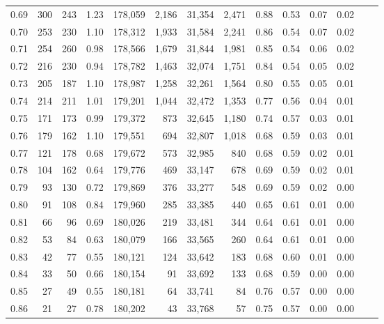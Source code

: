 \begin{tabular}{rrrrrrrrrrrrrr}
0.69 &    300 &  243 &    1.23 &  178,059 &    2,186 &  31,354 &   2,471 &  0.88 &  0.53 &  0.07 &      0.02 \\
0.70 &    253 &  230 &    1.10 &  178,312 &    1,933 &  31,584 &   2,241 &  0.86 &  0.54 &  0.07 &      0.02 \\
0.71 &    254 &  260 &    0.98 &  178,566 &    1,679 &  31,844 &   1,981 &  0.85 &  0.54 &  0.06 &      0.02 \\
0.72 &    216 &  230 &    0.94 &  178,782 &    1,463 &  32,074 &   1,751 &  0.84 &  0.54 &  0.05 &      0.02 \\
0.73 &    205 &  187 &    1.10 &  178,987 &    1,258 &  32,261 &   1,564 &  0.80 &  0.55 &  0.05 &      0.01 \\
0.74 &    214 &  211 &    1.01 &  179,201 &    1,044 &  32,472 &   1,353 &  0.77 &  0.56 &  0.04 &      0.01 \\
0.75 &    171 &  173 &    0.99 &  179,372 &      873 &  32,645 &   1,180 &  0.74 &  0.57 &  0.03 &      0.01 \\
0.76 &    179 &  162 &    1.10 &  179,551 &      694 &  32,807 &   1,018 &  0.68 &  0.59 &  0.03 &      0.01 \\
0.77 &    121 &  178 &    0.68 &  179,672 &      573 &  32,985 &     840 &  0.68 &  0.59 &  0.02 &      0.01 \\
0.78 &    104 &  162 &    0.64 &  179,776 &      469 &  33,147 &     678 &  0.69 &  0.59 &  0.02 &      0.01 \\
0.79 &     93 &  130 &    0.72 &  179,869 &      376 &  33,277 &     548 &  0.69 &  0.59 &  0.02 &      0.00 \\
0.80 &     91 &  108 &    0.84 &  179,960 &      285 &  33,385 &     440 &  0.65 &  0.61 &  0.01 &      0.00 \\
0.81 &     66 &   96 &    0.69 &  180,026 &      219 &  33,481 &     344 &  0.64 &  0.61 &  0.01 &      0.00 \\
0.82 &     53 &   84 &    0.63 &  180,079 &      166 &  33,565 &     260 &  0.64 &  0.61 &  0.01 &      0.00 \\
0.83 &     42 &   77 &    0.55 &  180,121 &      124 &  33,642 &     183 &  0.68 &  0.60 &  0.01 &      0.00 \\
0.84 &     33 &   50 &    0.66 &  180,154 &       91 &  33,692 &     133 &  0.68 &  0.59 &  0.00 &      0.00 \\
0.85 &     27 &   49 &    0.55 &  180,181 &       64 &  33,741 &      84 &  0.76 &  0.57 &  0.00 &      0.00 \\
0.86 &     21 &   27 &    0.78 &  180,202 &       43 &  33,768 &      57 &  0.75 &  0.57 &  0.00 &      0.00 \\

\end{tabular}
